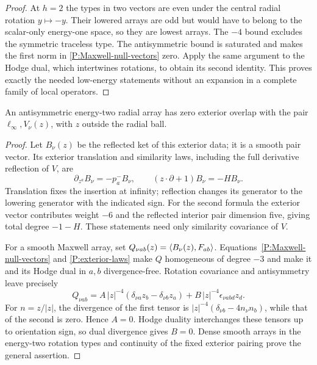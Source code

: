 \begin{proof}
At $h=2$ the types in two vectors are even under the central radial
rotation $y\mapsto-y$.  Their lowered arrays are odd but would have to belong to
the scalar-only energy-one space, so they are lowest arrays.  The
$-4$ bound excludes the symmetric traceless type.  The antisymmetric
bound is saturated and makes the first norm in
\eqref{P:Maxwell-null-vectors} zero.  Apply the same argument to the
Hodge dual, which intertwines rotations, to obtain its second
identity.  This proves exactly the needed low-energy statements
without an expansion in a complete family of local operators.
\end{proof}

\begin{lemma}
\label{P:Maxwell-exterior}
An antisymmetric energy-two radial array has zero exterior overlap
with the pair $\ell_\infty,V_\nu(z)$, with $z$ outside the radial ball.
\end{lemma}

\begin{proof}
Let $B_\nu(z)$ be the reflected ket of this exterior data; it is a
smooth pair vector.  Its exterior translation and similarity laws,
including the full derivative reflection of $V$, are
\begin{equation}
 \partial_{z^a}B_\nu=-p_a^-B_\nu,\qquad
 (z\cdot\partial+1)B_\nu=-HB_\nu.
 \label{P:exterior-laws}
\end{equation}
Translation fixes the insertion at infinity; reflection changes its
generator to the lowering generator with the indicated sign.  For
the second formula the exterior vector contributes weight $-6$ and
the reflected interior pair dimension five, giving total degree
$-1-H$.  These statements need only similarity covariance of $V$.

For a smooth Maxwell array, set
$Q_{\nu ab}(z)=\left\langle B_\nu(z),F_{ab}\right\rangle$.
Equations~\eqref{P:Maxwell-null-vectors} and
\eqref{P:exterior-laws} make $Q$ homogeneous of degree $-3$ and
make it and its Hodge dual in $a,b$ divergence-free.  Rotation
covariance and antisymmetry leave precisely
\begin{equation}
 Q_{\nu ab}=A\,|z|^{-4}(\delta_{\nu a}z_b-\delta_{\nu b}z_a)
            +B\,|z|^{-4}\epsilon_{\nu abd}z_d.
 \label{P:Maxwell-tensors}
\end{equation}
For $n=z/|z|$, the divergence of the first tensor is
$|z|^{-4}(\delta_{\nu b}-4n_\nu n_b)$, while that of the second is
zero.  Hence $A=0$.  Hodge duality interchanges these tensors up to
orientation sign, so dual divergence gives $B=0$.  Dense smooth
arrays in the energy-two rotation types and continuity of the fixed
exterior pairing prove the general assertion.
\end{proof}

